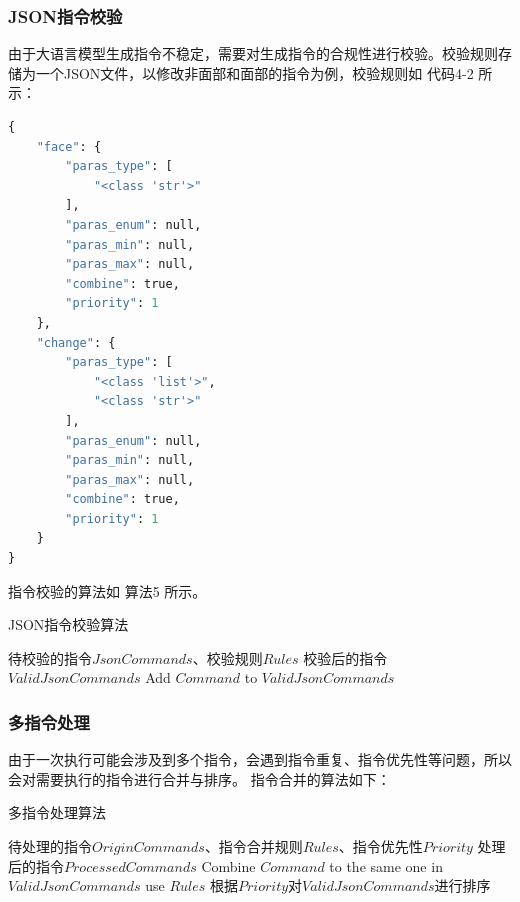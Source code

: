 \documentclass[a4paper,AutoFakeBold,oneside,12pt]{book}
\begin{document}
\subsubsection{JSON指令校验}
由于大语言模型生成指令不稳定，需要对生成指令的合规性进行校验。校验规则存储为一个JSON文件，以修改非面部和面部的指令为例，校验规则如 代码4-2 所示：
\begin{lstlisting}[language=Python, caption=指令校验规则, label=plus, tabsize=2]  
    {
    "face": {
        "paras_type": [
            "<class 'str'>"
        ],
        "paras_enum": null,
        "paras_min": null,
        "paras_max": null,
        "combine": true,
        "priority": 1
    },
    "change": {
        "paras_type": [
            "<class 'list'>",
            "<class 'str'>"
        ],
        "paras_enum": null,
        "paras_min": null,
        "paras_max": null,
        "combine": true,
        "priority": 1
    }
}
\end{lstlisting} 
指令校验的算法如 算法5 所示。
\begin{algorithm} 
	\begin{spacing}{1.3}
		\caption{JSON指令校验算法} 
		\label{JsonCommandCheckAlgorithm}
		\renewcommand{\algorithmicrequire}{\textbf{输入：}}
		\renewcommand{\algorithmicensure}{\textbf{输出：}} 
			\begin{algorithmic}[1] 
				\Require 待校验的指令$JsonCommands$、校验规则$Rules$
				\Ensure 校验后的指令$ValidJsonCommands$
                        \State Add $Command$ to $ValidJsonCommands$
                    \EndIf
                \EndFor
			\end{algorithmic}
	\end{spacing}
\end{algorithm}

\subsubsection{多指令处理}
由于一次执行可能会涉及到多个指令，会遇到指令重复、指令优先性等问题，所以会对需要执行的指令进行合并与排序。
指令合并的算法如下：
\begin{algorithm} 
	\begin{spacing}{1.3}
		\caption{多指令处理算法} 
		\label{JsonCommandsProcessingAlgorithm}
		\renewcommand{\algorithmicrequire}{\textbf{输入：}}
		\renewcommand{\algorithmicensure}{\textbf{输出：}} 
			\begin{algorithmic}[1] 
				\Require 待处理的指令$OriginCommands$、指令合并规则$Rules$、指令优先性$Priority$
				\Ensure 处理后的指令$ProcessedCommands$
                        \State Combine $Command$ to the same one in $ValidJsonCommands$ use $Rules$
                    \EndIf
                \EndFor
                \State 根据$Priority$对$ValidJsonCommands$进行排序
			\end{algorithmic}
	\end{spacing}
\end{algorithm}
\end{document}
